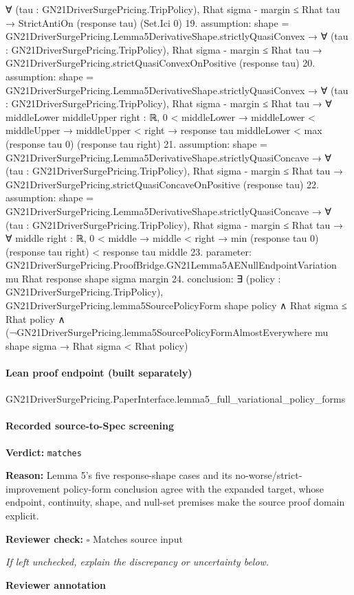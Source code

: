 \documentclass[10pt]{article}
\newcommand{\reviewerbox}{%
  \par\noindent\fbox{\parbox{0.96\linewidth}{\rule{0pt}{0.38in}}}\par
}
\newcommand{\reviewmatch}[1]{%
  \par\noindent\textbf{Reviewer check:} $\square$\; #1\par
  \noindent\emph{If left unchecked, explain the discrepancy or uncertainty below.}\par
}
\begin{document}
\begin{ReviewVerbatim}
  ∀ (tau : GN21DriverSurgePricing.TripPolicy), Rhat sigma - margin ≤ Rhat tau → StrictAntiOn (response tau) (Set.Ici 0)
19. assumption: shape = GN21DriverSurgePricing.Lemma5DerivativeShape.strictlyQuasiConvex →
  ∀ (tau : GN21DriverSurgePricing.TripPolicy),
    Rhat sigma - margin ≤ Rhat tau → GN21DriverSurgePricing.strictQuasiConvexOnPositive (response tau)
20. assumption: shape = GN21DriverSurgePricing.Lemma5DerivativeShape.strictlyQuasiConvex →
  ∀ (tau : GN21DriverSurgePricing.TripPolicy),
    Rhat sigma - margin ≤ Rhat tau →
      ∀ {middleLower middleUpper right : ℝ},
        0 < middleLower →
          middleLower < middleUpper →
            middleUpper < right → response tau middleLower < max (response tau 0) (response tau right)
21. assumption: shape = GN21DriverSurgePricing.Lemma5DerivativeShape.strictlyQuasiConcave →
  ∀ (tau : GN21DriverSurgePricing.TripPolicy),
    Rhat sigma - margin ≤ Rhat tau → GN21DriverSurgePricing.strictQuasiConcaveOnPositive (response tau)
22. assumption: shape = GN21DriverSurgePricing.Lemma5DerivativeShape.strictlyQuasiConcave →
  ∀ (tau : GN21DriverSurgePricing.TripPolicy),
    Rhat sigma - margin ≤ Rhat tau →
      ∀ {middle right : ℝ},
        0 < middle → middle < right → min (response tau 0) (response tau right) < response tau middle
23. parameter: GN21DriverSurgePricing.ProofBridge.GN21Lemma5AENullEndpointVariation mu Rhat response shape sigma margin
24. conclusion: ∃ (policy : GN21DriverSurgePricing.TripPolicy),
  GN21DriverSurgePricing.lemma5SourcePolicyForm shape policy ∧
    Rhat sigma ≤ Rhat policy ∧
      (¬GN21DriverSurgePricing.lemma5SourcePolicyFormAlmostEverywhere mu shape sigma → Rhat sigma < Rhat policy)
\end{ReviewVerbatim}

\paragraph{Lean proof endpoint (built separately)}\begin{ReviewVerbatim}
GN21DriverSurgePricing.PaperInterface.lemma5_full_variational_policy_forms
\end{ReviewVerbatim}

\paragraph{Recorded source-to-Spec screening}
\textbf{Verdict:} \texttt{matches}
\\
{\raggedright
\textbf{Reason:} Lemma 5's five response-\allowbreak{}shape cases and its no-\allowbreak{}worse/\allowbreak{}strict-\allowbreak{}improvement policy-\allowbreak{}form conclusion agree with the expanded target, whose endpoint, continuity, shape, and null-\allowbreak{}set premises make the source proof domain explicit.\allowbreak{}
\par}
\reviewmatch{Matches source input}
\noindent\textbf{Reviewer annotation}\par
\reviewerbox
\clearpage
\hypertarget{source-claim-f1c3806503822cde}{}
\hypertarget{source-section-6c491f2461bc0518}{}
\end{document}
